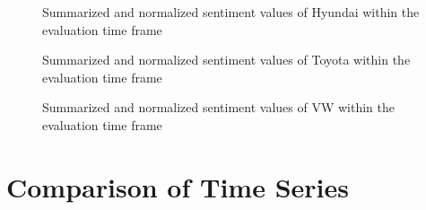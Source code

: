 \begin{figure}[hbt]
    \centering
        
    \caption{Summarized and normalized sentiment values of Hyundai within the evaluation time frame}
    \label{fig:analysis-results-hyundai}
\end{figure} 

\begin{figure}[hbt]
    \centering
        
    \caption{Summarized and normalized sentiment values of Toyota within the evaluation time frame}
    \label{fig:analysis-results-toyota}
\end{figure} 

\begin{figure}[hbt]
    \centering
        
    \caption{Summarized and normalized sentiment values of VW within the evaluation time frame}
    \label{fig:analysis-results-vw}
\end{figure} 

\section{Comparison of Time Series}
\label{s:analysis-granger}


